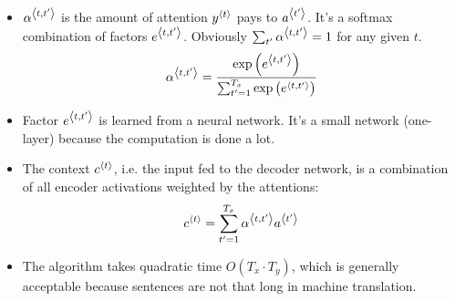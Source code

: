 \begin{itemize}
  \item $\alpha^{\left\langle t,t'\right\rangle}$ is the amount of attention $y^{\left\langle t\right\rangle}$ pays to $a^{\left\langle t'\right\rangle}$. It's a softmax combination of factors $e^{\left\langle t,t'\right\rangle}$. Obviously $\sum_{t'}\alpha^{\left\langle t,t'\right\rangle}=1$ for any given $t$.
  \[
    \alpha^{\left\langle t,t'\right\rangle}=\frac{\exp\left(e^{\left\langle t,t'\right\rangle}\right)}{\sum_{t'=1}^{T_x}\exp\left(e^{\left\langle t,t'\right\rangle}\right)}
  \]
\item Factor $e^{\left\langle t,t'\right\rangle}$ is learned from a neural network. It's a small network (one-layer) because the computation is done a lot.
\begin{center}
\end{center}
\item The context $c^{\left\langle t\right\rangle}$, i.e. the input fed to the decoder network, is a combination of all encoder activations weighted by the attentions:
\[c^{\left\langle t\right\rangle}=\displaystyle\sum_{t'=1}^{T_x}\alpha^{\left\langle t,t'\right\rangle}a^{\left\langle t'\right\rangle}\]
\item The algorithm takes quadratic time $O\left(T_x\cdot T_y\right)$, which is generally acceptable because sentences are not that long in machine translation.
\end{itemize}
